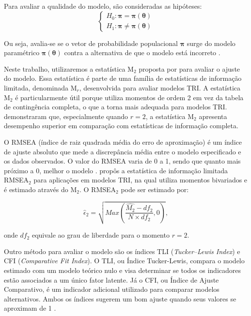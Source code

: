 Para avaliar a qualidade do modelo, são consideradas as hipóteses:
\[
\begin{cases}
H_0: \boldsymbol{\pi} = \boldsymbol{\pi}(\boldsymbol{\theta}) \\

H_1: \boldsymbol{\pi} \neq \boldsymbol{\pi}(\boldsymbol{\theta})
\end{cases}
\]

Ou seja, avalia-se se o vetor de probabilidade populacional $\boldsymbol{\pi}$ surge do modelo paramétrico $\boldsymbol{\pi}(\boldsymbol{\theta})$ contra a alternativa de que o modelo está incorreto \cite{maydeu2006limited}.

Neste trabalho, utilizaremos a estatística M$_2$ proposta por  para avaliar o ajuste do modelo. Essa estatística é parte de uma família de estatísticas de informação limitada, denominada M$_r$, desenvolvida para avaliar modelos TRI. A estatística M$_2$ é particularmente útil porque utiliza momentos de ordem 2 em vez da tabela de contingência completa, o que a torna mais adequada para modelos TRI.  demonstraram que, especialmente quando $r=2$, a estatística M$_2$ apresenta desempenho superior em comparação com estatísticas de informação completa. 



O RMSEA (índice de raiz quadrada média do erro de aproximação) é um índice de ajuste absoluto que mede a discrepância média entre o modelo especificado e os dados observados. O valor do RMSEA varia de 0 a 1, sendo que quanto mais próximo a 0, melhor o modelo \cite{kline2016principles}.  propôs a estatística de informação limitada RMSEA$_{2}$ para aplicações em modelos TRI, na qual utiliza momentos bivariados e é estimado através do M$_2$. O RMSEA$_2$ pode ser estimado por:

\[
	\hat{\epsilon}_2 = \sqrt{Max\left(\frac{\hat{M_{2}} - df_{2}}
		{N \times df_{2}}, 0 \right) } ,
\]

\noindent onde $df_2$ equivale ao grau de liberdade para o momento $r = 2$.



Outro método para avaliar o modelo são os índices TLI (\textit{Tucker–Lewis Index}) e CFI (\textit{Comparative Fit Index}). O TLI, ou Índice Tucker-Lewis, compara o modelo estimado com um modelo teórico nulo e visa determinar se todos os indicadores estão associados a um único fator latente. Já o CFI, ou Índice de Ajuste Comparativo, é um indicador adicional utilizado para comparar modelos alternativos. Ambos os índices sugerem um bom ajuste quando seus valores se aproximam de 1 \cite{hair2009multivariada}.

